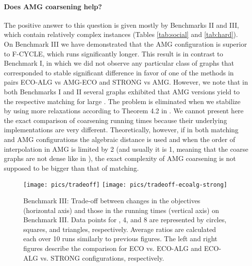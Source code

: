 \documentclass{llncs}
\begin{document}
\paragraph{Does AMG coarsening help?} The positive answer to this question is given mostly by Benchmarks II and III, which contain relatively complex instances (Tables \ref{tab:social} and \ref{tab:hard}). 
On Benchmark III we have demonstrated that the AMG configuration is superior to F-CYCLE, which runs significantly longer. 
This result is in contrast to Benchmark I, in which we did not observe any particular class of graphs that corresponded to stable significant difference in favor of one of the methods in pairs ECO-ALG vs AMG-ECO and STRONG vs AMG. However, we note that in both Benchmarks I and II several graphs exhibited that AMG versions yield to the respective matching for large . The problem is eliminated when we stabilize  by using more relaxations according to Theorem 4.2 in \cite{safro:relaxml}.
We cannot present here the exact comparison of coarsening running times because their underlying implementations are very different. Theoretically, however, if in both matching and AMG configurations the algebraic distance is used and when the order of interpolation in AMG is limited by 2 (and usually it is 1, meaning that the coarse graphs are not dense like in 
\cite{ChevalierS09}), the exact complexity of AMG coarsening is not supposed to be bigger than that of matching. 
\begin{figure}[t]
\vspace*{-.5cm}
\centering
\texttt{[image: pics/tradeoff]} \hspace{-.5cm}
 \texttt{[image: pics/tradeoff-ecoalg-strong]}\vspace*{-.5cm}
\caption{Benchmark III: Trade-off between changes in the objectives (horizontal axis) and those in the running times (vertical axis) on Benchmark III. Data points for , 4, and 8 are represented by circles, squares, and triangles, respectively. Average ratios are calculated each over 10 runs similarly to previous figures. The left and right figures describe the comparison for ECO vs. ECO-ALG and ECO-ALG vs. STRONG configurations, respectively.}\label{fig:hard-tradeoff}
                        \vspace*{-.5cm}
\end{figure}
\end{document}
